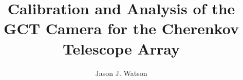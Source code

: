 \documentclass[a4paper,nobind]{ociamthesis}
\title{Calibration and Analysis of the GCT Camera for the Cherenkov Telescope Array}
\author{Jason J. Watson}
\numberwithin{equation}{subsection}
\begin{document}
\setlength{\textbaselineskip}{18pt plus2pt minus1pt}


\setlength{\frontmatterbaselineskip}{17pt plus1pt minus1pt}

\setlength{\baselineskip}{\textbaselineskip}


\setcounter{secnumdepth}{2}
\setcounter{tocdepth}{2}


\begin{abstractseparate}
	
\end{abstractseparate}


\begin{romanpages}


\maketitle


\begin{acknowledgements}
 	
\end{acknowledgements}


\begin{abstract}
	
\end{abstract}


\dominitoc


\flushbottom


\tableofcontents


\listoffigures
	\mtcaddchapter


%
\newpage
\printglossary[nonumberlist,type=\acronymtype,title=Abbreviations]


\end{romanpages}
\end{document}
